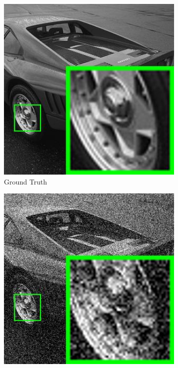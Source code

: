 \begin{figure}
    \centering
    \begin{subfigure}[t]{0.24\textwidth}
        \centering
        \includegraphics[width=1\textwidth]{images/pgpd/200img/br_29030.jpg}
	   \caption{Ground Truth}
    \end{subfigure}
    \hfill
    \begin{subfigure}[t]{0.24\textwidth}
        \centering
        \includegraphics[width=1\textwidth]{images/pgpd/200img/br_40_29030.jpg}

\end{subfigure}
\end{figure}
